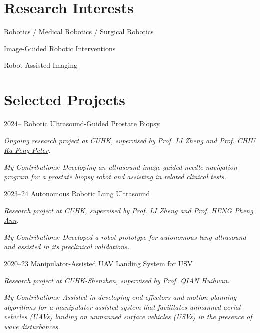 \documentclass[11pt,letterpaper]{report}
\newcommand{\listitemspace}{0.25em}
\renewenvironment{itemize}
{\begin{list}{}{\setlength{\leftmargin}{0em}
			\setlength{\parskip}{0em}
			\setlength{\itemsep}{\listitemspace}
			\setlength{\parsep}{\listitemspace}}}
	{\end{list}}
\begin{document}
\section*{Research Interests}
\begin{itemize}
	\item Robotics / Medical Robotics / Surgical Robotics
	\item Image-Guided Robotic Interventions
	\item Robot-Assisted Imaging
\end{itemize}
	
\section*{Selected Projects}
\begin{tablist}
	
	\item[2024--] \tab Robotic Ultrasound-Guided Prostate Biopsy

	\textit{Ongoing research project at CUHK, supervised by  \href{https://www.surgery.cuhk.edu.hk/profile.asp?alias=zli}{Prof. LI Zheng} and \href{https://www.surgery.cuhk.edu.hk/profile.asp?alias=peterchiu}{Prof. CHIU Ka Feng Peter}.}
	
	\textit{My Contributions: Developing an ultrasound image-guided needle navigation program for a prostate biopsy robot and assisting in related clinical tests.}
	
	\item[2023--24] \tab Autonomous Robotic Lung Ultrasound
	
	\textit{Research project at CUHK, supervised by \href{https://www.surgery.cuhk.edu.hk/profile.asp?alias=zli}{Prof. LI Zheng} and \href{https://www.cse.cuhk.edu.hk/people/faculty/pheng-ann-heng/}{Prof. HENG Pheng Ann}.}
	
	\emph{My Contributions: Developed a robot prototype for autonomous lung ultrasound and assisted in its preclinical validations.}

	\item[2020--23] \tab Manipulator-Assisted UAV Landing System for USV
	
	\textit{Research project at CUHK-Shenzhen, supervised by \href{https://sse.cuhk.edu.cn/en/faculty/qianhuihuan}{Prof. QIAN Huihuan}.}
	
	\emph{My Contributions: Assisted in developing end-effectors and motion planning algorithms for a manipulator-assisted system that facilitates unmanned aerial vehicles (UAVs) landing on unmanned surface vehicles (USVs) in the presence of wave disturbances. }	
\end{tablist}
	
\end{document}

